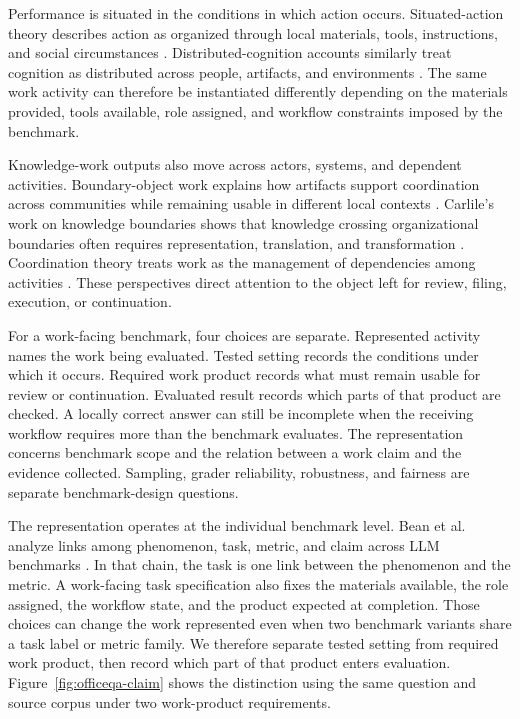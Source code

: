 \documentclass[10pt]{article}
\begin{document}
Performance is situated in the conditions in which action occurs. Situated-action theory describes action as organized through local materials, tools, instructions, and social circumstances \citep{suchman1987plans}. Distributed-cognition accounts similarly treat cognition as distributed across people, artifacts, and environments \citep{hutchins1995cognition}. The same work activity can therefore be instantiated differently depending on the materials provided, tools available, role assigned, and workflow constraints imposed by the benchmark.

Knowledge-work outputs also move across actors, systems, and dependent activities. Boundary-object work explains how artifacts support coordination across communities while remaining usable in different local contexts \citep{star1989institutional}. Carlile's work on knowledge boundaries shows that knowledge crossing organizational boundaries often requires representation, translation, and transformation \citep{carlile2002pragmatic,carlile2004transferring}. Coordination theory treats work as the management of dependencies among activities \citep{malone1994coordination}. These perspectives direct attention to the object left for review, filing, execution, or continuation.

For a work-facing benchmark, four choices are separate. Represented activity names the work being evaluated. Tested setting records the conditions under which it occurs. Required work product records what must remain usable for review or continuation. Evaluated result records which parts of that product are checked. A locally correct answer can still be incomplete when the receiving workflow requires more than the benchmark evaluates. The representation concerns benchmark scope and the relation between a work claim and the evidence collected. Sampling, grader reliability, robustness, and fairness are separate benchmark-design questions.

The representation operates at the individual benchmark level. Bean et al. analyze links among phenomenon, task, metric, and claim across LLM benchmarks \citep{bean2025measuring}. In that chain, the task is one link between the phenomenon and the metric. A work-facing task specification also fixes the materials available, the role assigned, the workflow state, and the product expected at completion. Those choices can change the work represented even when two benchmark variants share a task label or metric family. We therefore separate tested setting from required work product, then record which part of that product enters evaluation. Figure~\ref{fig:officeqa-claim} shows the distinction using the same question and source corpus under two work-product requirements.
\end{document}
